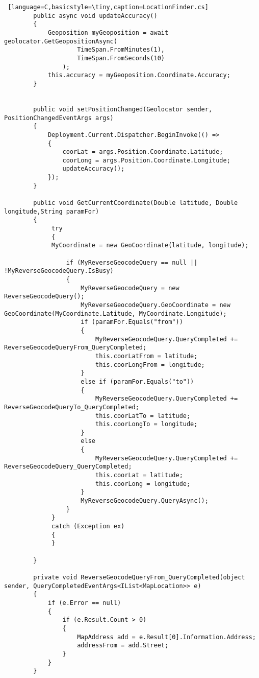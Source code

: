 \begin{lstlisting} [language=C,basicstyle=\tiny,caption=LocationFinder.cs]
        public async void updateAccuracy()
        {
            Geoposition myGeoposition = await geolocator.GetGeopositionAsync(
                    TimeSpan.FromMinutes(1),
                    TimeSpan.FromSeconds(10)
                );
            this.accuracy = myGeoposition.Coordinate.Accuracy;
        }


        public void setPositionChanged(Geolocator sender, PositionChangedEventArgs args)
        {
            Deployment.Current.Dispatcher.BeginInvoke(() =>
            {
                coorLat = args.Position.Coordinate.Latitude;
                coorLong = args.Position.Coordinate.Longitude;
                updateAccuracy();
            });
        }

        public void GetCurrentCoordinate(Double latitude, Double longitude,String paramFor)
        {
             try
             {
             MyCoordinate = new GeoCoordinate(latitude, longitude);
 
                 if (MyReverseGeocodeQuery == null || !MyReverseGeocodeQuery.IsBusy)
                 {
                     MyReverseGeocodeQuery = new ReverseGeocodeQuery();
                     MyReverseGeocodeQuery.GeoCoordinate = new GeoCoordinate(MyCoordinate.Latitude, MyCoordinate.Longitude);
                     if (paramFor.Equals("from"))
                     {
                         MyReverseGeocodeQuery.QueryCompleted += ReverseGeocodeQueryFrom_QueryCompleted;
                         this.coorLatFrom = latitude;
                         this.coorLongFrom = longitude;
                     }
                     else if (paramFor.Equals("to"))
                     {
                         MyReverseGeocodeQuery.QueryCompleted += ReverseGeocodeQueryTo_QueryCompleted;
                         this.coorLatTo = latitude;
                         this.coorLongTo = longitude;
                     }
                     else 
                     {
                         MyReverseGeocodeQuery.QueryCompleted += ReverseGeocodeQuery_QueryCompleted;
                         this.coorLat = latitude;
                         this.coorLong = longitude;
                     }
                     MyReverseGeocodeQuery.QueryAsync();
                 }
             }
             catch (Exception ex)
             {
             }
           
        }

        private void ReverseGeocodeQueryFrom_QueryCompleted(object sender, QueryCompletedEventArgs<IList<MapLocation>> e)
        {
            if (e.Error == null)
            {
                if (e.Result.Count > 0)
                {
                    MapAddress add = e.Result[0].Information.Address;
                    addressFrom = add.Street;
                }
            }
        }


\end{lstlisting}
